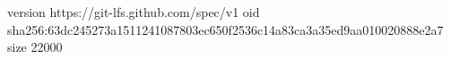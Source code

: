 version https://git-lfs.github.com/spec/v1
oid sha256:63dc245273a1511241087803ec650f2536c14a83ca3a35ed9aa010020888e2a7
size 22000
